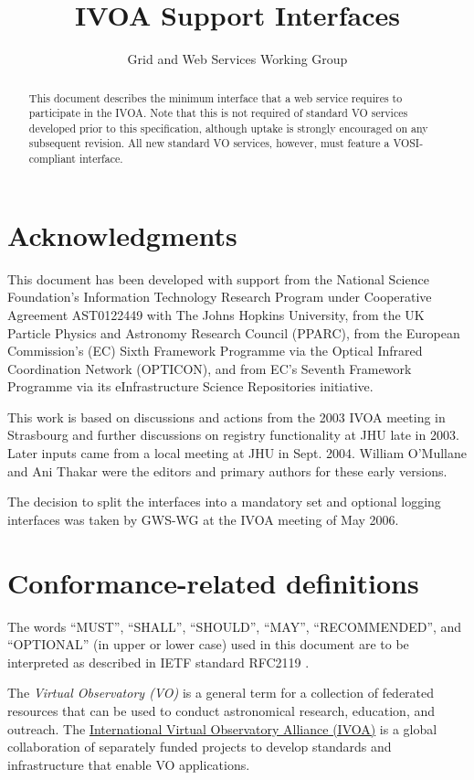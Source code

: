 \documentclass[11pt,letter]{ivoa}
\title{IVOA Support Interfaces}
\author{Grid and Web Services Working Group}
\begin{document}
\begin{abstract}
This document describes the minimum interface that a web service requires to participate in the IVOA. Note that this is not required of standard VO services developed prior to this specification, although uptake is strongly encouraged on any subsequent revision. All new standard VO services, however, must feature a VOSI-compliant interface. 
\end{abstract}


\section*{Acknowledgments}

This document has been developed with support from the National Science Foundation's Information Technology Research Program under Cooperative Agreement AST0122449 with The Johns Hopkins University, from the UK Particle Physics and Astronomy Research Council (PPARC), from the European Commission's (EC) Sixth Framework Programme via the Optical Infrared Coordination Network (OPTICON), and from EC's Seventh Framework Programme via its eInfrastructure Science Repositories initiative.

This work is based on discussions and actions from the 2003 IVOA meeting in Strasbourg and further discussions on registry functionality at JHU late in 2003. Later inputs came from a local meeting at JHU in Sept. 2004. William O'Mullane and Ani Thakar were the editors and primary authors for these early versions.

The decision to split the interfaces into a mandatory set and optional logging interfaces was taken by GWS-WG at the IVOA meeting of May 2006. 

\section*{Conformance-related definitions}

The words ``MUST'', ``SHALL'', ``SHOULD'', ``MAY'', ``RECOMMENDED'', and
``OPTIONAL'' (in upper or lower case) used in this document are to be
interpreted as described in IETF standard RFC2119 \citep{std:RFC2119}.

The \emph{Virtual Observatory (VO)} is a
general term for a collection of federated resources that can be used
to conduct astronomical research, education, and outreach.
The \href{http://www.ivoa.net}{International
Virtual Observatory Alliance (IVOA)} is a global
collaboration of separately funded projects to develop standards and
infrastructure that enable VO applications.
\end{document}

